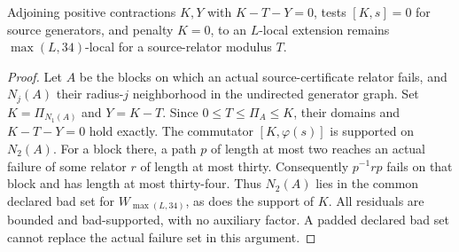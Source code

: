 \begin{lemma}\label{lem:local-invariance}
Adjoining positive contractions $K,Y$ with $K-T-Y=0$, tests $[K,s]=0$ for source generators, and penalty $K=0$, to an $L$-local extension remains $\max(L,34)$-local for a source-relator modulus $T$.
\end{lemma}
\begin{proof}
Let $A$ be the blocks on which an actual source-certificate relator fails, and $N_j(A)$ their radius-$j$ neighborhood in the undirected generator graph. Set $K=\Pi_{N_1(A)}$ and $Y=K-T$. Since $0\le T\le\Pi_A\le K$, their domains and $K-T-Y=0$ hold exactly. The commutator $[K,\varphi(s)]$ is supported on $N_2(A)$. For a block there, a path $p$ of length at most two reaches an actual failure of some relator $r$ of length at most thirty. Consequently $p^{-1}rp$ fails on that block and has length at most thirty-four. Thus $N_2(A)$ lies in the common declared bad set for $W_{\max(L,34)}$, as does the support of $K$. All residuals are bounded and bad-supported, with no auxiliary factor. A padded declared bad set cannot replace the actual failure set in this argument.
\end{proof}

